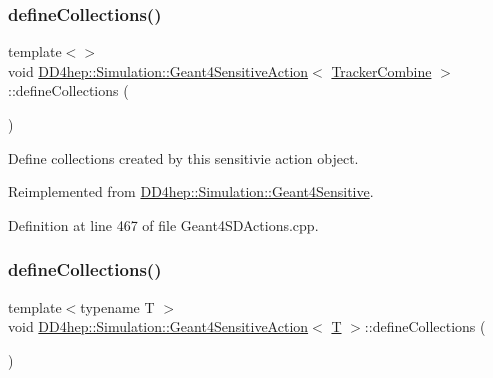 \subsubsection{\texorpdfstring{define\+Collections()}{defineCollections()}\hspace{0.1cm}{\footnotesize\ttfamily [6/7]}}
{\footnotesize\ttfamily template$<$$>$ \\
void \hyperlink{class_d_d4hep_1_1_simulation_1_1_geant4_sensitive_action}{D\+D4hep\+::\+Simulation\+::\+Geant4\+Sensitive\+Action}$<$ \hyperlink{struct_d_d4hep_1_1_simulation_1_1_tracker_combine}{Tracker\+Combine} $>$\+::define\+Collections (\begin{DoxyParamCaption}{ }\end{DoxyParamCaption})\hspace{0.3cm}{\ttfamily [virtual]}}



Define collections created by this sensitivie action object. 



Reimplemented from \hyperlink{class_d_d4hep_1_1_simulation_1_1_geant4_sensitive_a88c872b79e49e399c8ee282960c2d77d}{D\+D4hep\+::\+Simulation\+::\+Geant4\+Sensitive}.



Definition at line 467 of file Geant4\+S\+D\+Actions.\+cpp.

\hypertarget{class_d_d4hep_1_1_simulation_1_1_geant4_sensitive_action_a103768b61e0f22768de9a91ce588a88c}{}\label{class_d_d4hep_1_1_simulation_1_1_geant4_sensitive_action_a103768b61e0f22768de9a91ce588a88c} 
\subsubsection{\texorpdfstring{define\+Collections()}{defineCollections()}\hspace{0.1cm}{\footnotesize\ttfamily [7/7]}}
{\footnotesize\ttfamily template$<$typename T $>$ \\
void \hyperlink{class_d_d4hep_1_1_simulation_1_1_geant4_sensitive_action}{D\+D4hep\+::\+Simulation\+::\+Geant4\+Sensitive\+Action}$<$ \hyperlink{class_t}{T} $>$\+::define\+Collections (\begin{DoxyParamCaption}{ }\end{DoxyParamCaption})\hspace{0.3cm}{\ttfamily [virtual]}}




